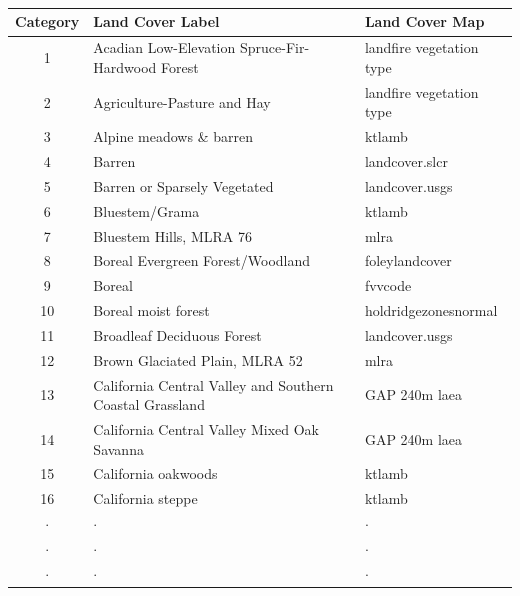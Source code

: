\begin{frame}
 \frametitle{}\tiny
 \begin{tabular}{c l l}
  \textbf{Category}  & \textbf{Land Cover Label} & \textbf{Land Cover Map} \\
\hline
1 & Acadian Low-Elevation Spruce-Fir-Hardwood Forest & landfire vegetation type \\
2 & Agriculture-Pasture and Hay & landfire vegetation type \\
3 & Alpine meadows \& barren & ktlamb \\
4 & Barren & landcover.slcr \\
5 & Barren or Sparsely Vegetated & landcover.usgs \\
6 & Bluestem/Grama & ktlamb \\
7 & Bluestem Hills, MLRA 76 & mlra \\
8 & Boreal Evergreen Forest/Woodland & foleylandcover \\
9 & Boreal & fvvcode \\
10 & Boreal moist forest & holdridgezonesnormal \\
11 & Broadleaf Deciduous Forest & landcover.usgs \\
12 & Brown Glaciated Plain, MLRA 52 & mlra \\
13 & California Central Valley and Southern Coastal Grassland & GAP 240m laea \\
14 & California Central Valley Mixed Oak Savanna & GAP 240m laea \\
15 & California oakwoods & ktlamb \\
16 & California steppe & ktlamb \\
$\cdot$ & $\cdot$ & $\cdot$ \\
$\cdot$ & $\cdot$ & $\cdot$ \\
$\cdot$ & $\cdot$ & $\cdot$ \\

\end{tabular}
\end{frame}
